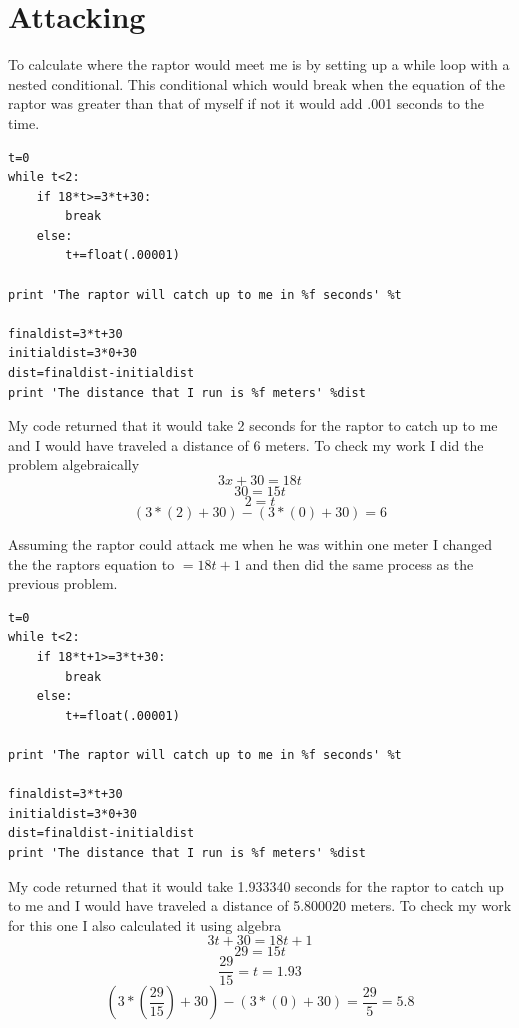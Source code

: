 \documentclass[twocolumn]{revtex4}
\begin{document}
\section{Attacking}
To calculate where the raptor would meet me is by setting up a while loop with a nested conditional. This conditional which would break when the equation of the raptor was greater than that of myself if not it would add .001 seconds to the time.
\begin{lstlisting}
t=0
while t<2:
    if 18*t>=3*t+30:
        break
    else:
        t+=float(.00001)

print 'The raptor will catch up to me in %f seconds' %t

finaldist=3*t+30
initialdist=3*0+30
dist=finaldist-initialdist
print 'The distance that I run is %f meters' %dist   
\end{lstlisting}
My code returned that it would take 2 seconds for the raptor to catch up to me and I would have traveled a distance of 6 meters. To check my work I did the problem algebraically
    $$3x+30=18t$$ 
    $$30=15t$$
    $$2=t$$
    $$(3*(2)+30)-(3*(0)+30)=6$$
    

Assuming the raptor could attack me when he was within one meter I changed the the raptors equation to $=18t+1$ and then did the same process as the previous problem.
\lstset{language=Python,} 
\begin{lstlisting}
t=0
while t<2:
    if 18*t+1>=3*t+30:
        break
    else:
        t+=float(.00001)

print 'The raptor will catch up to me in %f seconds' %t

finaldist=3*t+30
initialdist=3*0+30
dist=finaldist-initialdist
print 'The distance that I run is %f meters' %dist    
\end{lstlisting}
My code returned that it would take 1.933340 seconds for the raptor to catch up to me and I would have traveled a distance of 5.800020 meters.
To check my work for this one I also calculated it using algebra
    $$3t+30=18t+1$$
    $$29=15t$$
    $$\frac{29}{15}=t=1.93$$
    $$(3*(\frac{29}{15})+30)-(3*(0)+30)=\frac{29}{5}=5.8$$

\end{document}
